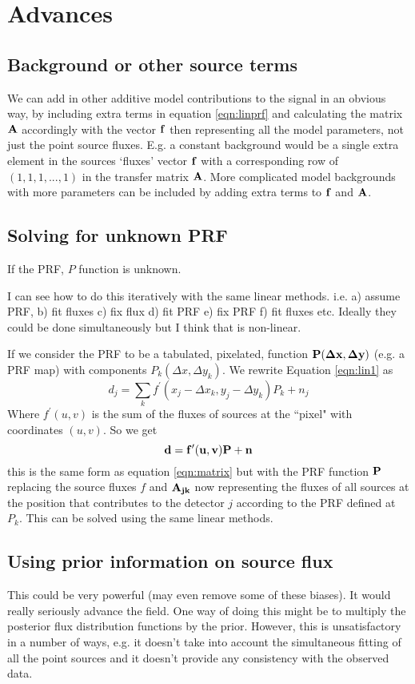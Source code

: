 \documentclass{article}
\begin{document}
\section{Advances}
\subsection{Background or other source terms}
We can add in other additive model contributions to the signal in an obvious way, by including extra terms in equation \ref{eqn:linprf} and calculating the matrix ${\bf A}$ accordingly with the vector ${\bf f}$ then representing all the model parameters, not just the point source fluxes.  E.g. a constant background would be a single extra element in the sources `fluxes' vector ${\bf f}$ with a corresponding row of $(1,1,1,...,1)$ in the transfer matrix ${\bf A}$. More complicated model backgrounds with more parameters can be included by adding extra terms to ${\bf f}$ and ${\bf A}$.
\subsection{Solving for unknown PRF}
If the PRF, $P$ function is unknown.

I can see how to do this iteratively with the same linear methods.  i.e. a) assume PRF, b) fit fluxes c) fix flux d) fit PRF e) fix PRF f) fit fluxes etc.  Ideally they could be done simultaneously  but I think that is non-linear.

If we consider the PRF to be a tabulated, pixelated, function ${\bf P}({\bf \Delta x}, {\bf \Delta y})$ (e.g. a PRF map) with components $P_k( \Delta x, \Delta y_k)$. We rewrite Equation \ref{eqn:lin1} as
\begin{equation}
d_j=\sum_k{f^\prime(x_j-\Delta x_k, y_j-\Delta y_k)}P_k+n_j \label{eqn:lin2}
\end{equation}
Where $f^\prime(u,v)$ is the sum of the fluxes of sources at the ``pixel" with coordinates $(u,v)$. So we get 
\begin{equation}
{\bf d}={\bf f}^\prime({\bf u},{\bf v}){\bf P}+{\bf n}\label{eqn:linprf2}
\end{equation}
this is the same form as equation \ref{eqn:matrix} but with the PRF function ${\bf P}$ replacing the source fluxes $f$ and ${\bf A_{jk}}$ now representing the fluxes of all sources at the position that contributes to the detector $j$ according to the PRF defined at $P_k$. This can be solved using the same linear methods.
\subsection{Using prior information on source flux}
This could be very powerful (may even remove some of these biases).  It would really seriously advance the field.  One way of doing this might be to multiply the posterior flux distribution functions by the prior.  However, this is unsatisfactory in a number of ways, e.g. it doesn't take into account the simultaneous fitting of all the point sources and it doesn't provide any consistency with the observed data. 
\end{document}

